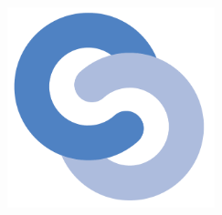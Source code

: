 \begin{titlepage}
  \begin{addmargin}[-1cm]{-3cm}
    \begin{center}
        \large

        \hfill

        \vfill

        \begingroup
            \color{Maroon}\spacedallcaps{\myTitle} \\ \bigskip
        \endgroup

        \spacedlowsmallcaps{\myName}

        \vfill

        \includegraphics[width=6cm]{gfx/cs} \\ \medskip

        \myDegree \\ \medskip
        \myDepartment \\
        \myFaculty \\
        \myUni \\ \bigskip

        \myTime

        \vfill

    \end{center}
  \end{addmargin}
\end{titlepage}

